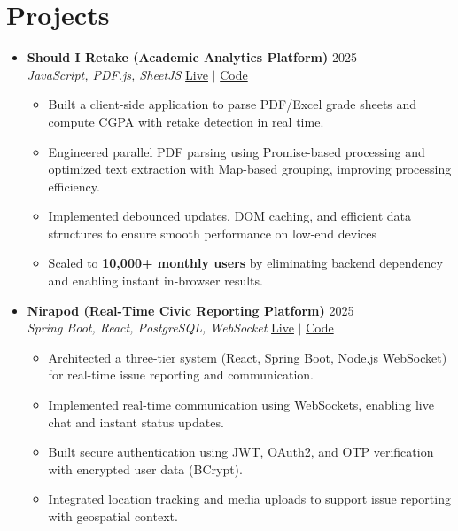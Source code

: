 \documentclass[a4paper]{article}
\newcommand{\resumeItem}[1]{
  \item\small{
    {#1 \vspace{-2pt}}
  }
}
\newcommand{\resumeItemListStart}{\begin{itemize}}
\newcommand{\resumeItemListEnd}{\end{itemize}\vspace{-5pt}}
\begin{document}
\section{Projects}
  \begin{itemize}[leftmargin=0.15in, label={}, itemsep=6pt]

    \item
    \textbf{Should I Retake (Academic Analytics Platform)} \hfill 2025\\
    \small\textit{JavaScript, PDF.js, SheetJS} \hfill
    \href{https://badhon495.github.io/should-i-retake/}{Live} $|$
    \href{https://github.com/badhon495/should-i-retake}{Code}
    \vspace{-5pt}
    \resumeItemListStart
      \resumeItem{Built a client-side application to parse PDF/Excel grade sheets and compute CGPA with retake detection in real time.}
      \resumeItem{Engineered parallel PDF parsing using Promise-based processing and optimized text extraction with Map-based grouping, improving processing efficiency.}
      \resumeItem{Implemented debounced updates, DOM caching, and efficient data structures to ensure smooth performance on low-end devices}
      \resumeItem{Scaled to \textbf{10,000+ monthly users} by eliminating backend dependency and enabling instant in-browser results.}
    \resumeItemListEnd

    \item
    \textbf{Nirapod (Real-Time Civic Reporting Platform)} \hfill 2025\\
    \small\textit{Spring Boot, React, PostgreSQL, WebSocket} \hfill
    \href{https://nirapod.netlify.app/}{Live} $|$
    \href{https://github.com/badhon495/Nirapod}{Code}
    \vspace{-5pt}
    \resumeItemListStart
      \resumeItem{Architected a three-tier system (React, Spring Boot, Node.js WebSocket) for real-time issue reporting and communication.}
      \resumeItem{Implemented real-time communication using WebSockets, enabling live chat and instant status updates.}
      \resumeItem{Built secure authentication using JWT, OAuth2, and OTP verification with encrypted user data (BCrypt).}
      \resumeItem{Integrated location tracking and media uploads to support issue reporting with geospatial context.}
    \resumeItemListEnd


\end{itemize}
\end{document}
